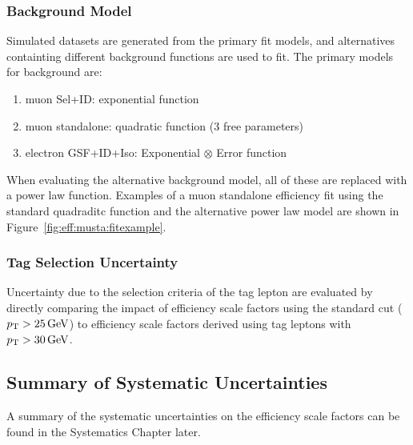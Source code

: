 \subsubsection{Background Model}
Simulated datasets are generated from the primary fit models, and alternatives containting different background functions are used to fit. The primary models for background are: 
\begin{enumerate}
\item muon Sel+ID: exponential function
\item muon standalone: quadratic function (3 free parameters)
\item electron GSF+ID+Iso: Exponential $\otimes$ Error function
\end{enumerate}
When evaluating the alternative background model, all of these are replaced with a power law function. Examples of a muon standalone efficiency fit using the standard quadraditc function and the alternative power law model are shown in Figure~\ref{fig:eff:musta:fitexample}. 


\subsubsection{Tag Selection Uncertainty}
Uncertainty due to the selection criteria of the tag lepton are evaluated by directly comparing the impact of efficiency scale factors using the standard cut ($p_{\mathrm{T}} > 25 \,\text{Ge\hspace{-.08em}V}$) to efficiency scale factors derived using tag leptons with $p_{\mathrm{T}} > 30\,\text{Ge\hspace{-.08em}V}$.

\subsection{Summary of Systematic Uncertainties}
A summary of the systematic uncertainties on the efficiency scale factors can be found in the Systematics Chapter later. 

